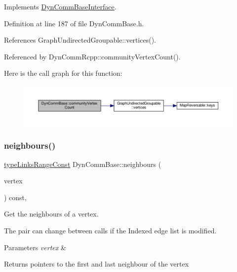 Implements \hyperlink{classDynCommBaseInterface_a2b4c4a130a2de5eb6cd79af88969ef3c}{Dyn\+Comm\+Base\+Interface}.



Definition at line 187 of file Dyn\+Comm\+Base.\+h.



References Graph\+Undirected\+Groupable\+::vertices().



Referenced by Dyn\+Comm\+Rcpp\+::community\+Vertex\+Count().

Here is the call graph for this function\+:
\nopagebreak
\begin{figure}[H]
\begin{center}
\leavevmode
\includegraphics[width=350pt]{classDynCommBase_ad02f1853b63e1ceaf24b05cfdbcf7a49_cgraph}
\end{center}
\end{figure}
\mbox{\label{classDynCommBase_a3500faab82a0547422b2202b79f49718}} 
\subsubsection{\texorpdfstring{neighbours()}{neighbours()}}
{\footnotesize\ttfamily \hyperlink{graphInterface_8h_ae8d27008f15586bbf419af7ad2e0a48a}{type\+Links\+Range\+Const} Dyn\+Comm\+Base\+::neighbours (\begin{DoxyParamCaption}\item[{\hyperlink{edge_8h_a5fbd20c46956d479cb10afc9855223f6}{type\+Vertex}}]{vertex }\end{DoxyParamCaption}) const\hspace{0.3cm}{\ttfamily [inline]}, {\ttfamily [virtual]}}



Get the neighbours of a vertex. 

The pair can change between calls if the Indexed edge list is modified. 
\begin{DoxyParams}{Parameters}
{\em vertex} & \\
\hline
\end{DoxyParams}
\begin{DoxyReturn}{Returns}
pointers to the first and last neighbour of the vertex 
\end{DoxyReturn}


